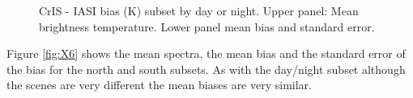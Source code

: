 \documentclass[11pt]{article}
\begin{document}


\begin{figure}[htb]
    \centering
    \quad
    \caption{CrIS - IASI bias (K) subset by day or night. Upper panel: Mean brightness temperature. Lower panel mean bias and standard error.}%
    \label{fig:X5}%
\end{figure}

Figure \ref{fig:X6} shows the mean spectra, the mean bias and the standard error of the bias for the north and south subsets.
As with the day/night subset although the scenes are very different the mean biases are
very similar.
\end{document}
